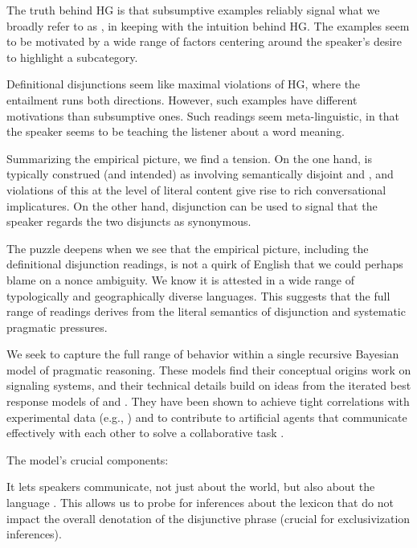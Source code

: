 \documentclass{article}
\begin{document}
\begin{examples}
\item The truth behind HG is that subsumptive examples reliably signal
  what we broadly refer to as , in keeping with
  the intuition behind HG.  The examples seem to be motivated by a
  wide range of factors centering around the speaker's desire to
  highlight a subcategory.

\item Definitional disjunctions seem like maximal violations of HG,
  where the entailment runs both directions. However, such examples
  have different motivations than subsumptive ones. Such readings seem
  meta-linguistic, in that the speaker seems to be teaching the
  listener about a word meaning.

\item Summarizing the empirical picture, we find a tension. On the one
  hand,  is typically construed (and intended) as
  involving semantically disjoint  and , and
  violations of this at the level of literal content give rise to rich
  conversational implicatures. On the other hand, disjunction can be
  used to signal that the speaker regards the two disjuncts as
  synonymous.

\item The puzzle deepens when we see that the empirical picture,
  including the definitional disjunction readings, is not a quirk of
  English that we could perhaps blame on a nonce ambiguity. We know it
  is attested in a wide range of typologically and geographically
  diverse languages. This suggests that the full range of readings
  derives from the literal semantics of disjunction and systematic
  pragmatic pressures.

\item We seek to capture the full range of behavior within a single
  recursive Bayesian model of pragmatic reasoning.  These models find
  their conceptual origins  work on signaling
  systems, and their technical details build on ideas from the
  iterated best response models of \citet{Jaeger:2007} and
  \citet{Franke09DISS}. They have been shown to achieve tight
  correlations with experimental data (e.g.,
  \citealt{Frank:Goodman:2012}) and to contribute to artificial agents
  that communicate effectively with each other to solve a
  collaborative task \citep{Vogel-etal:2013}.

\item The model's crucial components:

  \begin{examples}
  \item It lets speakers communicate, not just about the world, but
    also about the language \citep{Smith:Goodman:Frank:2013}. This
    allows us to probe for inferences about the lexicon that do not
    impact the overall denotation of the disjunctive phrase (crucial
    for exclusivization inferences).


\end{examples}
\end{examples}
\end{document}
